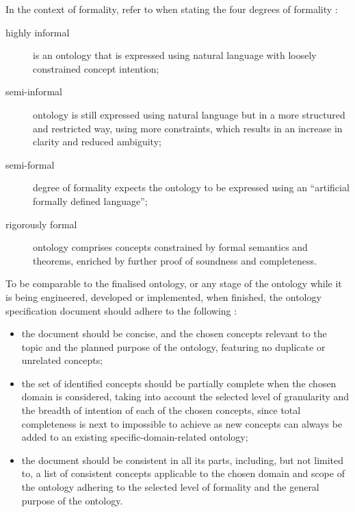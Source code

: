 In the context of formality, \citeauthor{fernandez-lopez1997METHONTOLOGYOntologicalArt} refer to \citeauthor{uschold1996OntologiesPrinciplesMethods} when stating the four degrees of formality \cite{uschold1996OntologiesPrinciplesMethods}:

\begin{description}
    \item [highly informal] is an ontology that is expressed using natural language with loosely constrained concept intention;
    \item [semi-informal] ontology is still expressed using natural language but in a more structured and restricted way, using more constraints, which results in an increase in clarity and reduced ambiguity;
    \item [semi-formal] degree of formality expects the ontology to be expressed using an \enquote[\cite{uschold1996OntologiesPrinciplesMethods}]{artificial formally defined language};
    \item [rigorously formal] ontology comprises concepts constrained by formal semantics and theorems, enriched by further proof of soundness and completeness.
\end{description}

To be comparable to the finalised ontology, or any stage of the ontology while it is being engineered, developed or implemented, when finished, the ontology specification document should adhere to the following
\cite{fernandez-lopez1997METHONTOLOGYOntologicalArt}%
:

\begin{itemize}
    \item the document should be concise, and the chosen concepts relevant to the topic and the planned purpose of the ontology, featuring no duplicate or unrelated concepts;

    \item the set of identified concepts should be partially complete when the chosen domain is considered, taking into account the selected level of granularity and the breadth of intention of each of the chosen concepts, since total completeness is next to impossible to achieve as new concepts can always be added to an existing specific-domain-related ontology;

    \item the document should be consistent in all its parts, including, but not limited to, a list of consistent concepts applicable to the chosen domain and scope of the ontology adhering to the selected level of formality and the general purpose of the ontology.
\end{itemize}



